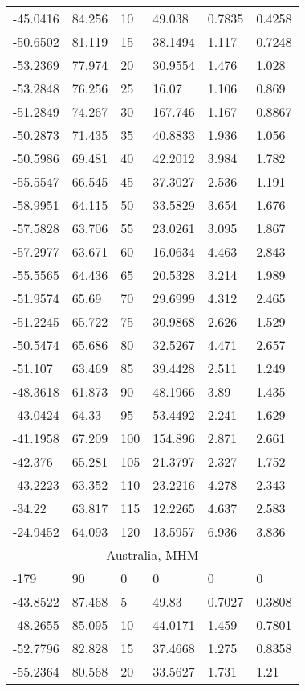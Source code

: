 \begin{longtable}[c]{@{}llllll@{}}
-45.0416 & 84.256 & 10 & 49.038 & 0.7835 & 0.4258 \\
-50.6502 & 81.119 & 15 & 38.1494 & 1.117 & 0.7248 \\
-53.2369 & 77.974 & 20 & 30.9554 & 1.476 & 1.028 \\
-53.2848 & 76.256 & 25 & 16.07 & 1.106 & 0.869 \\
-51.2849 & 74.267 & 30 & 167.746 & 1.167 & 0.8867 \\
-50.2873 & 71.435 & 35 & 40.8833 & 1.936 & 1.056 \\
-50.5986 & 69.481 & 40 & 42.2012 & 3.984 & 1.782 \\
-55.5547 & 66.545 & 45 & 37.3027 & 2.536 & 1.191 \\
-58.9951 & 64.115 & 50 & 33.5829 & 3.654 & 1.676 \\
-57.5828 & 63.706 & 55 & 23.0261 & 3.095 & 1.867 \\
-57.2977 & 63.671 & 60 & 16.0634 & 4.463 & 2.843 \\
-55.5565 & 64.436 & 65 & 20.5328 & 3.214 & 1.989 \\
-51.9574 & 65.69 & 70 & 29.6999 & 4.312 & 2.465 \\
-51.2245 & 65.722 & 75 & 30.9868 & 2.626 & 1.529 \\
-50.5474 & 65.686 & 80 & 32.5267 & 4.471 & 2.657 \\
-51.107 & 63.469 & 85 & 39.4428 & 2.511 & 1.249 \\
-48.3618 & 61.873 & 90 & 48.1966 & 3.89 & 1.435 \\
-43.0424 & 64.33 & 95 & 53.4492 & 2.241 & 1.629 \\
-41.1958 & 67.209 & 100 & 154.896 & 2.871 & 2.661 \\
-42.376 & 65.281 & 105 & 21.3797 & 2.327 & 1.752 \\
-43.2223 & 63.352 & 110 & 23.2216 & 4.278 & 2.343 \\
-34.22 & 63.817 & 115 & 12.2265 & 4.637 & 2.583 \\
-24.9452 & 64.093 & 120 & 13.5957 & 6.936 & 3.836 \\
\multicolumn{6}{c}{Australia, MHM} \\
-179 & 90 & 0 & 0 & 0 & 0 \\
-43.8522 & 87.468 & 5 & 49.83 & 0.7027 & 0.3808 \\
-48.2655 & 85.095 & 10 & 44.0171 & 1.459 & 0.7801 \\
-52.7796 & 82.828 & 15 & 37.4668 & 1.275 & 0.8358 \\
-55.2364 & 80.568 & 20 & 33.5627 & 1.731 & 1.21 \\

\end{longtable}
